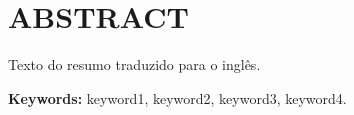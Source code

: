 \chapter*{ABSTRACT}
\label{abstract}

Texto do resumo traduzido para o inglês.

\vspace{1cm}

\noindent\textbf{Keywords:} keyword1, keyword2, keyword3, keyword4.
